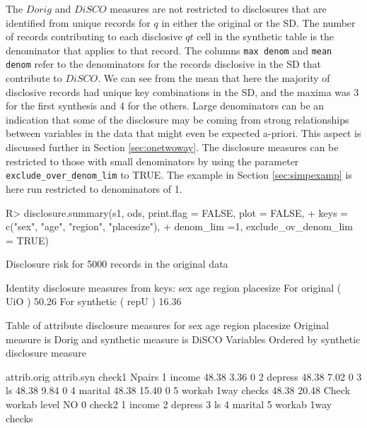 \documentclass[12pt]{article}
\renewcommand{\baselinestretch}{1.5} %
\begin{document}
The $Dorig$ and $DiSCO$ measures are not restricted to disclosures that are identified from unique records for $q$ in either the original or the SD. The number of records contributing to each disclosive $qt$ cell in the synthetic table is the denominator that applies to that record. The columns \texttt{max denom} and \texttt{mean denom} refer to the denominators for the records disclosive in the SD that contribute to $DiSCO$. We can see from the mean that here the majority of disclosive records had unique key combinations in the SD, and the maxima was 3 for the first synthesis and 4 for the others. Large denominators can be an indication that some of the disclosure may be coming from strong relationships between variables in the data that might even be expected 
a-priori. This aspect is discussed further in Section \ref{sec:onetwoway}. The disclosure measures can be restricted to those with small denominators by using
the parameter \texttt{exclude\_over\_denom\_lim} to TRUE. The example in Section \ref{sec:simpexamp} is here run restricted to denominators of 1.
\renewcommand{\baselinestretch}{1.0}
\begin{Schunk}
\begin{Sinput}
R> disclosure.summary(s1, ods, print.flag = FALSE, plot = FALSE,
+    keys = c("sex", "age", "region", "placesize"),
+    denom_lim =1, exclude_ov_denom_lim = TRUE)
\end{Sinput}
\begin{Soutput}
Disclosure risk for 5000 records in the original data

Identity disclosure measures
from keys: sex age region placesize 
For original  ( UiO )  50.26 %
For synthetic ( repU ) 16.36 %

Table of attribute disclosure measures for sex age region placesize 
Original measure is  Dorig and synthetic measure is DiSCO 
Variables Ordered by synthetic disclosure measure

                     attrib.orig attrib.syn                   check1 Npairs
1 income                   48.38       3.36                               0
2 depress                  48.38       7.02                               0
3 ls                       48.38       9.84                               0
4 marital                  48.38      15.40                               0
5 workab 1way checks       48.38      20.48 Check  workab  level  NO      0
                     check2
1 income                   
2 depress                  
3 ls                       
4 marital                  
5 workab 1way checks       
\end{Soutput}
\end{Schunk}
\renewcommand{\baselinestretch}{1.5}
\end{document}
